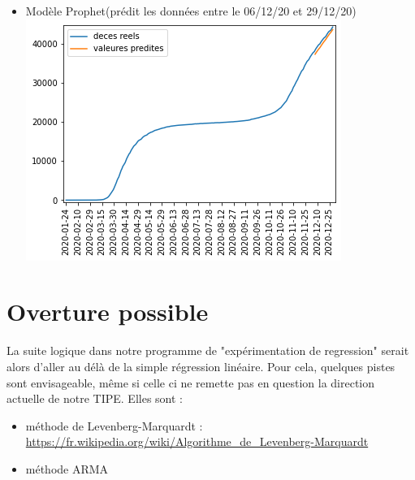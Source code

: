 \documentclass[a4paper,11pt]{article}
\begin{document}
\begin{itemize}
		\item Modèle Prophet(prédit les données entre le 06/12/20 et 29/12/20)\\
		\includegraphics[scale=1]{Figure_Prophet}\\
		
	\end{itemize}

\section{Overture possible}
	La suite logique dans notre programme de "expérimentation de
	regression" serait alors d'aller au délà de la simple régression
	linéaire.
	Pour cela, quelques pistes sont envisageable, même si celle ci ne
	remette pas en question la direction actuelle de notre TIPE.
	Elles sont :
	\begin{itemize}
		\item méthode de Levenberg-Marquardt :\\ 
		\url{https://fr.wikipedia.org/wiki/Algorithme_de_Levenberg-Marquardt}
		\item méthode ARMA
	\end{itemize}
\end{document}
